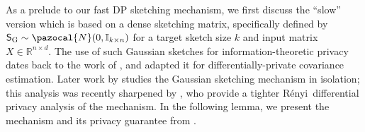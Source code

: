 \documentclass[11pt]{article}
\theoremstyle{definition}
\theoremstyle{plain}
\newcommand{\reals}{\mathbb{R}}
\providecommand{\brI}{\mathbb{I}}
\newcommand{\pN}{\pazocal{N}}
\newcommand{\Renyi}{{\normalfont R\'enyi}~}
\begin{document}
As a prelude to our fast DP sketching mechanism, we first discuss the ``slow'' version which is based on a dense sketching matrix, specifically defined by \(\mathsf{S}_{\mathrm{G}} \sim \pN(0, \brI_{k \times n})\) for a target sketch size \(k\) and input matrix \(X \in \reals^{n \times d}\).
The use of such Gaussian sketches for information-theoretic privacy dates back to the work of \citet{zhou2007}, and \citet{blocki2012johnson} adapted it for differentially-private covariance estimation.
Later work by \citet{sheffet2017differentially,sheffet2019old} studies the Gaussian sketching mechanism in isolation; this analysis was recently sharpened by \citet{lev2025gaussianmix}, who provide a tighter \Renyi differential privacy analysis of the mechanism.
In the following lemma, we present the mechanism and its privacy guarantee from \citet{lev2025gaussianmix}.
\end{document}

